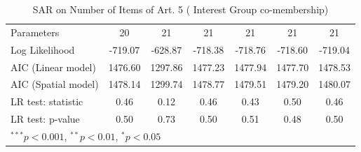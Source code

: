 \begin{table}[!h]
\begin{center}
\begin{tabular}{l c c c c c c }
Parameters              & 20           & 21           & 21           & 21           & 21           & 21           \\
Log Likelihood          & -719.07      & -628.87      & -718.38      & -718.76      & -718.60      & -719.04      \\
AIC (Linear model)      & 1476.60      & 1297.86      & 1477.23      & 1477.94      & 1477.70      & 1478.53      \\
AIC (Spatial model)     & 1478.14      & 1299.74      & 1478.77      & 1479.51      & 1479.20      & 1480.07      \\
LR test: statistic      & 0.46         & 0.12         & 0.46         & 0.43         & 0.50         & 0.46         \\
LR test: p-value        & 0.50         & 0.73         & 0.50         & 0.51         & 0.48         & 0.50         \\
\bottomrule
\multicolumn{7}{l}{\scriptsize{$^{***}p<0.001$, $^{**}p<0.01$, $^*p<0.05$}}
\end{tabular}
\caption{SAR on Number of Items of Art. 5 ( Interest Group co-membership)}
\label{table:coefficients}
\end{center}
\end{table}
